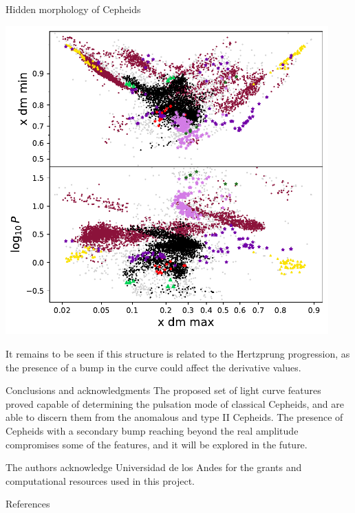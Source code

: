 \documentclass[
    a0paper,
    portrait,
]{baposter}
\begin{document}
\begin{poster}
\begin{posterbox}[name=struct,column=2,below=features]{Hidden morphology of Cepheids}
    \vspace{-2mm}
    \begin{center}
    \includegraphics[width=0.93\textwidth]{fig/sctruct.pdf}
    \vspace{-2mm}
    \label{fig:struct}
    \end{center}
    \vspace{-2mm}

    It remains to be seen if this structure is related to the Hertzprung progression, as the presence of a bump in the curve could affect the derivative values.
\end{posterbox}



\begin{posterbox}[name=conclusions,column=2,below=struct]{Conclusions and acknowledgments}
    The proposed set of light curve features proved capable of determining the pulsation mode of classical Cepheids, and are able to discern them from the anomalous and type II Cepheids.    
    The presence of Cepheids with a secondary bump reaching beyond the real amplitude compromises some of the features, and it will be explored in the future. 
    
    The authors acknowledge Universidad de los Andes for the grants and computational resources used in this project.
\end{posterbox}


\begin{posterbox}[column=2,below=conclusions,height=bottom]{References}
\tiny
\setlength{\parskip}{0em}
\setlength{\bibsep}{0pt plus 0.8ex}
    
\end{posterbox}



\end{poster}
\end{document}
